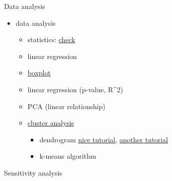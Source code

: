 \documentclass[9pt,ignorenonframetext,]{beamer}
\providecommand{\tightlist}{%
  \setlength{\itemsep}{0pt}\setlength{\parskip}{0pt}}
\begin{document}
\begin{frame}{Data analysis}

\begin{itemize}
\tightlist
\item
  data analysis

  \begin{itemize}
  \tightlist
  \item
    statistics:
    \href{https://www.hydrology.uni-kiel.de/de/mitarbeiter/Statistics}{check}
  \item
    linear regression
  \item
    \href{https://cran.r-project.org/web/packages/beanplot/vignettes/beanplot.pdf}{boxplot}
  \item
    linear regression (p-value, R\^{}2)
  \item
    PCA (linear relationship)
  \item
    \href{http://www.sthda.com/english/articles/25-cluster-analysis-in-r-practical-guide/111-types-of-clustering-methods-overview-and-quick-start-r-code/}{cluster
    analysis}

    \begin{itemize}
    \tightlist
    \item
      dendrogram
      \href{http://www.sthda.com/english/wiki/beautiful-dendrogram-visualizations-in-r-5-must-known-methods-unsupervised-machine-learning}{nice
      tutorial}, \href{https://rpubs.com/gaston/dendrograms}{another
      tutorial}
    \item
      k-means algorithm
    \end{itemize}
  \end{itemize}
\end{itemize}

\end{frame}

\begin{frame}{Sensitivity analysis}

\end{frame}
\end{document}
